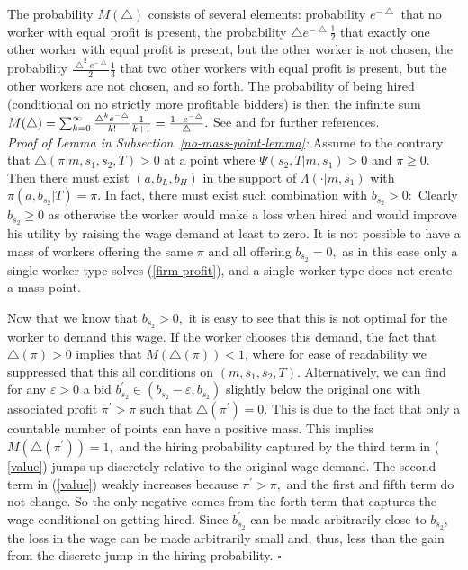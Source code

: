 \documentclass[12pt]{article}
\begin{document}
The probability $M(\bigtriangleup )$ consists of several elements:
probability $e^{-\bigtriangleup }$ that no worker with equal profit is
present, the probability $\bigtriangleup e^{-\bigtriangleup }\frac{1}{2}$
that exactly one other worker with equal profit is present, but the other
worker is not chosen, the probability $\frac{\bigtriangleup
^{2}e^{-\bigtriangleup }}{2}\frac{1}{3}$ that two other workers with equal
profit is present, but the other workers are not chosen, and so forth. The probability
of being hired (conditional on no strictly more profitable bidders) is then
the infinite sum $M(\bigtriangleup )=\sum_{k=0}^{\infty }\frac{\bigtriangleup
^{k}e^{-\bigtriangleup }}{k!}\frac{1}{k+1}=\frac{1-e^{-\bigtriangleup }}{%
\bigtriangleup }.$
See \cite{burdett_etal2001} and \cite{wright_etal2021} for further references. \\


\textit{Proof of Lemma in Subsection~\ref{no-mass-point-lemma}:} 
Assume to the contrary
that $\bigtriangleup (\pi |m,s_{1},s_{2},T)>0$ at a point where $\Psi
(s_{2},T|m,s_{1})>0$ and $\pi \geq 0$. Then there must exist $%
(a,b_{L},b_{H}) $ in the support of $\Lambda (\cdot |m,s_{1})$ with $\pi
(a,b_{s_{2}}|T)=\pi .$ In fact, there must exist such combination with $%
b_{s_{2}}>0:$ Clearly $b_{s_{2}}\geq 0$ as otherwise the worker would make a
loss when hired and would improve his utility by raising the wage demand at
least to zero. It is not possible to have a mass of workers offering the
same $\pi $ and all offering $b_{s_{2}}=0,$ as in this case only a single
worker type solves (\ref{firm-profit}), and a single worker type does not
create a mass point.

Now that we know that $b_{s_{2}}>0,$ it is easy to see that this is not
optimal for the worker to demand this wage. If the worker chooses this
demand, the fact that $\bigtriangleup (\pi )>0$ implies that $%
M(\bigtriangleup (\pi ))<1$, where for ease of readability we suppressed
that this all conditions on $(m,s_{1},s_{2},T).$ Alternatively, we can find
for any $\varepsilon >0$ a bid $b_{s_{2}}^{\prime }\in
(b_{s_{2}}-\varepsilon ,b_{s_{2}})$ slightly below the original one with
associated profit $\pi ^{\prime }>\pi $ such that $\bigtriangleup (\pi
^{\prime })=0.$ This is due to the fact that only a countable number of
points can have a positive mass. This implies $M(\bigtriangleup (\pi
^{\prime }))=1,$ and the hiring probability captured by the third term in (%
\ref{value}) jumps up discretely relative to the original wage demand$.$ The
second term in (\ref{value}) weakly increases because $\pi ^{\prime }>\pi ,$
and the first and fifth term do not change. So the only negative comes from
the forth term that captures the wage conditional on getting hired. Since $%
b_{s_{2}}^{\prime }$ can be made arbitrarily close to $b_{s_{2}},$ the loss
in the wage can be made arbitrarily small and, thus, less than the gain from
the discrete jump in the hiring probability. $\square $
\end{document}
